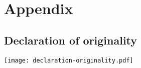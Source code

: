 \section*{Appendix}


\subsection{Declaration of originality}
%
\noindent
\texttt{[image: declaration-originality.pdf]}
\vfill
